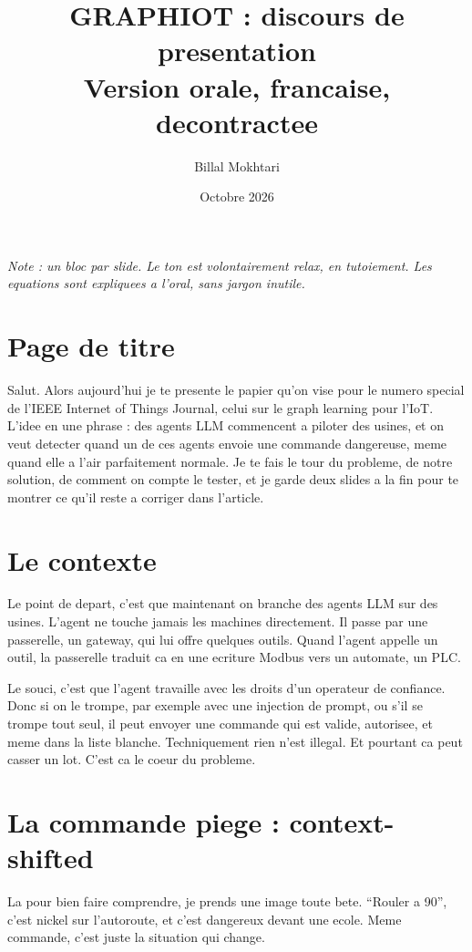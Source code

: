 \documentclass[11pt]{article}
\title{\textbf{GRAPHIOT : discours de presentation}\\[0.3em]
\large Version orale, francaise, decontractee}
\author{Billal Mokhtari}
\date{Octobre 2026}
\begin{document}
\maketitle
\noindent\textit{Note : un bloc par slide. Le ton est volontairement
relax, en tutoiement. Les equations sont expliquees a l'oral, sans jargon
inutile.}

\hrulefill

\section{Page de titre}
Salut. Alors aujourd'hui je te presente le papier qu'on vise pour le numero
special de l'IEEE Internet of Things Journal, celui sur le graph learning pour
l'IoT. L'idee en une phrase : des agents LLM commencent a piloter des usines, et
on veut detecter quand un de ces agents envoie une commande dangereuse, meme
quand elle a l'air parfaitement normale. Je te fais le tour du probleme, de notre
solution, de comment on compte le tester, et je garde deux slides a la fin pour te
montrer ce qu'il reste a corriger dans l'article.

\section{Le contexte}
Le point de depart, c'est que maintenant on branche des agents LLM sur des usines.
L'agent ne touche jamais les machines directement. Il passe par une passerelle, un
gateway, qui lui offre quelques outils. Quand l'agent appelle un outil, la
passerelle traduit ca en une ecriture Modbus vers un automate, un PLC.

Le souci, c'est que l'agent travaille avec les droits d'un operateur de confiance.
Donc si on le trompe, par exemple avec une injection de prompt, ou s'il se trompe
tout seul, il peut envoyer une commande qui est valide, autorisee, et meme dans la
liste blanche. Techniquement rien n'est illegal. Et pourtant ca peut casser un
lot. C'est ca le coeur du probleme.

\section{La commande piege : context-shifted}
La pour bien faire comprendre, je prends une image toute bete. ``Rouler a 90'',
c'est nickel sur l'autoroute, et c'est dangereux devant une ecole. Meme commande,
c'est juste la situation qui change.
\end{document}
